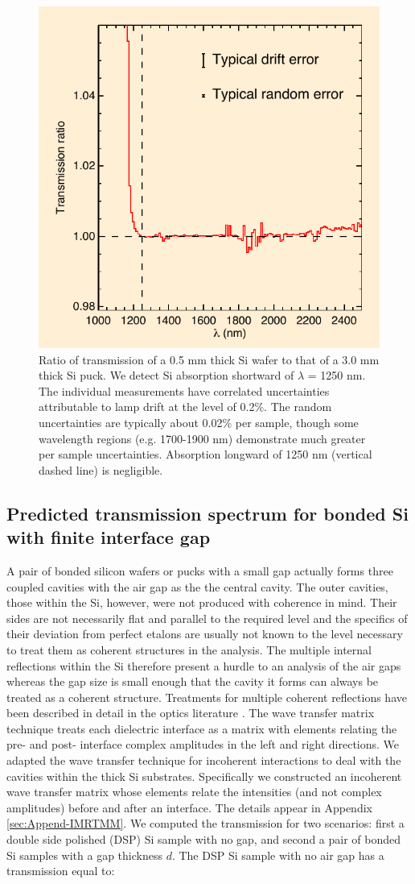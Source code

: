 \documentclass[osajnl,preprint,showpacs,superscriptaddress,12pt]{revtex4-1} %
\begin{document}
\begin{figure}[htbp]
\centerline{\includegraphics[width=0.40\columnwidth]{figs/fpAbsorbfig_alt}}
\caption{Ratio of transmission of a 0.5 mm thick Si wafer to that of a 3.0 mm thick Si puck.  \label{figSiAbsorbfig} We detect Si absorption shortward of $\lambda$ = 1250 nm.  The individual measurements have correlated uncertainties attributable to lamp drift at the level of 0.2\%.  The random uncertainties are typically about 0.02\% per sample, though some wavelength regions (e.g. 1700-1900 nm) demonstrate much greater per sample uncertainties.  Absorption longward of 1250 nm (vertical dashed line) is negligible.}
\end{figure}

\subsection{Predicted transmission spectrum for bonded Si with finite interface gap}
\label{secTheory}
A pair of bonded silicon wafers or pucks with a small gap actually forms three coupled cavities with the air gap as the the central cavity.  The outer cavities, those within the Si, however, were not produced with coherence in mind.  Their sides are not necessarily flat and parallel to the required level and the specifics of their deviation from perfect etalons are usually not known to the level necessary to treat them as coherent structures in the analysis.  The multiple internal reflections within the Si therefore present a hurdle to an analysis of the air gaps whereas the gap size is small enough that the cavity it forms can always be treated as a coherent structure.  Treatments for multiple coherent reflections have been described in detail in the optics literature \cite{2007fuph.book.....S}.  The wave transfer matrix technique treats each dielectric interface as a matrix with elements relating the pre- and post- interface complex amplitudes in the left and right directions.  We adapted the wave transfer technique for incoherent interactions \cite{2002ApOpt..41.3978K} to deal with the cavities within the thick Si substrates.  Specifically we constructed an incoherent wave transfer matrix whose elements relate the intensities (and not complex amplitudes) before and after an interface.  The details appear in Appendix \ref{sec:Append-IMRTMM}.  We computed the transmission for two scenarios: first a double side polished (DSP) Si sample with no gap, and second a pair of bonded Si samples with a gap thickness $d$.  The DSP Si sample with no air gap has a transmission equal to:
\end{document}
